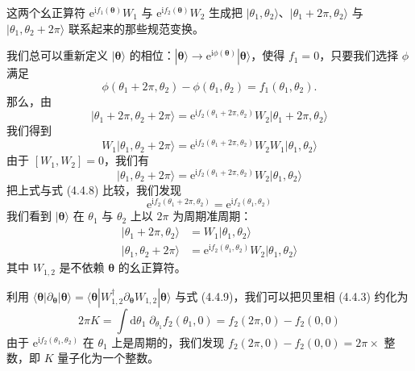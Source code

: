 这两个幺正算符 $\mathrm{e}^{\mathrm{i} f_{1}(\pmb{\theta})} W_{1}$ 与 $\mathrm{e}^{\mathrm{i} f_{2}(\pmb{\theta})} W_{2}$ 生成把 $|\theta_{1}, \theta_{2}\rangle$、$|\theta_{1} + 2\pi, \theta_{2}\rangle$ 与 $|\theta_{1}, \theta_{2} + 2\pi\rangle$ 联系起来的那些规范变换。

我们总可以重新定义 $|\pmb{\theta}\rangle$ 的相位：$|\pmb{\theta}\rangle \to \mathrm{e}^{\mathrm{i} \phi(\pmb{\theta})} |\pmb{\theta}\rangle$，使得 $f_{1} = 0$，只要我们选择 $\phi$ 满足
\begin{equation*}
\phi(\theta_{1} + 2\pi, \theta_{2}) - \phi(\theta_{1}, \theta_{2}) = f_{1}(\theta_{1}, \theta_{2}).
\end{equation*}
那么，由
\begin{equation*}
\big| \theta_{1} + 2\pi, \theta_{2} + 2\pi \big\rangle = \mathrm{e}^{\mathrm{i} f_{2}(\theta_{1}+2\pi, \theta_{2})} W_{2} \big| \theta_{1} + 2\pi, \theta_{2} \big\rangle
\end{equation*}
我们得到
\begin{equation*}
W_{1} \big| \theta_{1}, \theta_{2} + 2\pi \big\rangle = \mathrm{e}^{\mathrm{i} f_{2}(\theta_{1}+2\pi, \theta_{2})} W_{2} W_{1} \big| \theta_{1}, \theta_{2} \big\rangle
\end{equation*}
由于 $[W_{1}, W_{2}] = 0$，我们有
\begin{equation*}
\big| \theta_{1}, \theta_{2} + 2\pi \big\rangle = \mathrm{e}^{\mathrm{i} f_{2}(\theta_{1}+2\pi, \theta_{2})} W_{2} \big| \theta_{1}, \theta_{2} \big\rangle
\end{equation*}
把上式与式 (4.4.8) 比较，我们发现
\begin{equation*}
\mathrm{e}^{\mathrm{i} f_{2}(\theta_{1}+2\pi, \theta_{2})} = \mathrm{e}^{\mathrm{i} f_{2}(\theta_{1}, \theta_{2})}
\end{equation*}
我们看到 $|\pmb{\theta}\rangle$ 在 $\theta_{1}$ 与 $\theta_{2}$ 上以 $2\pi$ 为周期准周期：
\begin{align*}
\big| \theta_{1} + 2\pi, \theta_{2} \big\rangle &= W_{1} \big| \theta_{1}, \theta_{2} \big\rangle\\
\big| \theta_{1}, \theta_{2} + 2\pi \big\rangle &= \mathrm{e}^{\mathrm{i} f_{2}(\theta_{1}, \theta_{2})} W_{2} \big| \theta_{1}, \theta_{2} \big\rangle \tag{4.4.9}
\end{align*}
其中 $W_{1,2}$ 是不依赖 $\pmb{\theta}$ 的幺正算符。

利用 $\langle \pmb{\theta} | \partial_{\pmb{\theta}} | \pmb{\theta} \rangle = \langle \pmb{\theta} | W_{1,2}^{\dagger} \partial_{\pmb{\theta}} W_{1,2} | \pmb{\theta} \rangle$ 与式 (4.4.9)，我们可以把贝里相 (4.4.3) 约化为
\begin{equation*}
2\pi K = \int \mathrm{d}\theta_{1}\; \partial_{\theta_{1}} f_{2}(\theta_{1}, 0) = f_{2}(2\pi, 0) - f_{2}(0, 0)
\end{equation*}
由于 $\mathrm{e}^{\mathrm{i} f_{2}(\theta_{1}, \theta_{2})}$ 在 $\theta_{1}$ 上是周期的，我们发现 $f_{2}(2\pi, 0) - f_{2}(0, 0) = 2\pi \times$ 整数，即 $K$ 量子化为一个整数。

